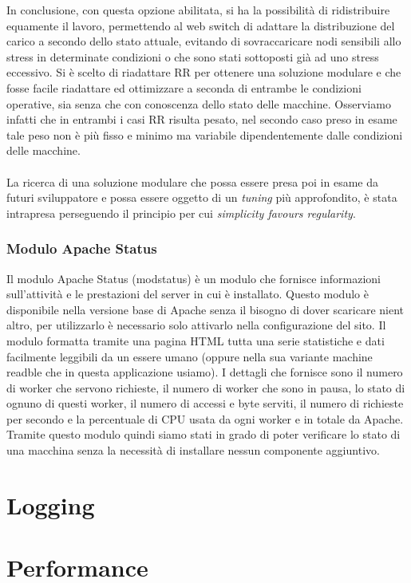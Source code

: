 \documentclass[italian]{tktltiki2}
\begin{document}
In conclusione, con questa opzione abilitata, si ha la possibilità di ridistribuire equamente il lavoro, permettendo al web switch di adattare la distribuzione del carico a secondo dello stato attuale, evitando di sovraccaricare nodi sensibili allo stress in determinate condizioni o che sono stati sottoposti già ad uno stress eccessivo. Si è scelto di riadattare RR per ottenere una soluzione modulare e che fosse facile riadattare ed ottimizzare a seconda di entrambe le condizioni operative, sia senza che con conoscenza dello stato delle macchine. Osserviamo infatti che in entrambi i casi RR risulta pesato, nel secondo caso preso in esame tale peso non è più fisso e minimo ma variabile dipendentemente dalle condizioni delle macchine.\\\\
La ricerca di una soluzione modulare che possa essere presa poi in esame da futuri sviluppatore e possa essere oggetto di un \emph{tuning} più approfondito, è stata intrapresa perseguendo il principio per cui \emph{simplicity favours regularity}.

\subsubsection{Modulo Apache Status}
\label{sssec:apachestatus}
Il modulo Apache Status (modstatus) è un modulo che fornisce informazioni sull'attività e le prestazioni del server in cui è installato. Questo modulo è disponibile nella versione base di Apache senza il bisogno di dover scaricare nient altro, per utilizzarlo è necessario solo attivarlo nella configurazione del sito. Il modulo formatta tramite una pagina HTML tutta una serie statistiche e dati facilmente leggibili da un essere umano (oppure nella sua variante machine readble che in questa applicazione usiamo). I dettagli che fornisce sono il numero di worker che servono richieste, il numero di worker che sono in pausa, lo stato di ognuno di questi worker, il numero di accessi e byte serviti, il numero di richieste per secondo e la percentuale di CPU usata da ogni worker e in totale da Apache.
Tramite questo modulo quindi siamo stati in grado di poter verificare lo stato di una macchina senza la necessità di installare nessun componente aggiuntivo.


\newpage
\section{Logging}
\newpage
\section{Performance}
\end{document}
